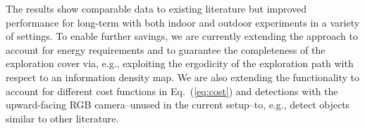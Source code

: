 \documentclass[lettersize,journal,twoside]{IEEEtran}
\theoremstyle{definition}
\begin{document}
The results show comparable data to existing literature but improved performance for long-term with both indoor and outdoor experiments in a variety of settings. To enable further savings, we are currently extending the approach to account for energy requirements and to guarantee the completeness of the exploration cover via, e.g., exploiting the ergodicity of the exploration path with respect to an information density map.
We are also extending the functionality to account for different cost functions in Eq.~(\ref{eq:cost}) and detections with the upward-facing RGB camera--unused in the current setup--to, e.g., detect objects similar to other literature. %








\end{document}
